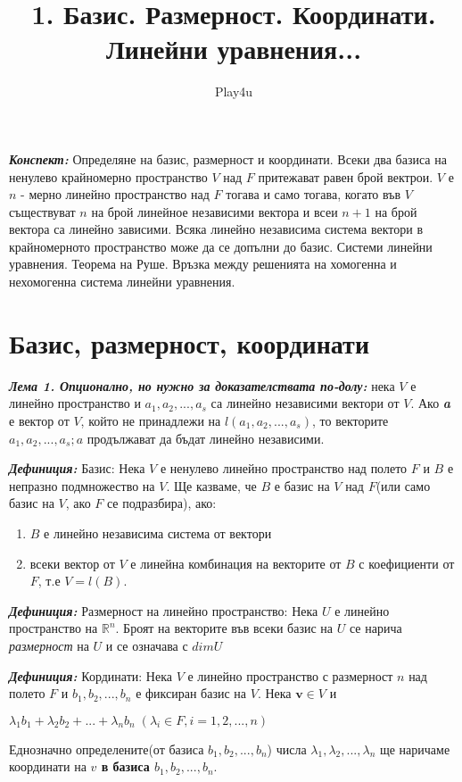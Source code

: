 \documentclass[11pt]{article} %
\title{1. Базис. Размерност. Координати. Линейни уравнения...}
\author{Play4u}
\newcommand{\italicBold}[1]{\textbf{\emph{#1}}}
\newcommand{\definition}{\italicBold{Дефиниция: }}
\newcommand{\enumNum}{\renewcommand{\theenumi}{\arabic{enumi}}}
\begin{document}
\maketitle

\italicBold{Конспект:} Определяне на базис, размерност и координати. Всеки два базиса на ненулево крайномерно пространство $V$ над $F$ притежават равен брой вектрои. $V$ е $n$ - мерно линейно пространство над $F$ тогава и само тогава, когато във $V$ съществуват $n$ на брой линейное независими вектора и всеи $n+1$ на брой вектора са линейно зависими. Всяка линейно независима система вектори в крайномерното пространство може да се допълни до базис. Системи линейни уравнения. Теорема на Руше. Връзка между решенията на хомогенна и нехомогенна система линейни уравнения.


\section{Базис, размерност, координати}

\italicBold{Лема 1. Опционално, но нужно за доказателствата по-долу: } нека $V$ е линейно пространство и $a_{1}, a_{2}, ..., a_{s}$ са линейно независими вектори от $V$. Ако \textbf{\textit{a}} е вектор от $V$, който не принадлежи на $l(a_{1}, a_{2}, ..., a_{s})$, то векторите $a_{1}, a_{2}, ..., a_{s}; a$ продължават да бъдат линейно независими.\\\par   

\definition Базис: Нека $V$ е ненулево линейно пространство над полето $F$ и $B$ е непразно подмножество на $V$. Ще казваме, че $B$ е базис на $V$ над $F$(или само базис на $V$, ако $F$ се подразбира), ако: \\

\enumNum
\begin{enumerate}
	\item $B$ е линейно независима система от вектори \\
	\item всеки вектор от $V$ е линейна комбинация на векторите от $B$ с коефициенти от $F$, т.е $V = l(B)$.
\end{enumerate}\par

\definition Размерност на линейно пространство: Нека $U$ е линейно пространство на $\mathbb{R}^{n}$. Броят на векторите във всеки базис на $U$ се нарича \textit{размерност} на $U$ и се означава с $dimU$

\definition Кординати: Нека $V$ е линейно пространство с размерност $n$ над полето $F$ и $b_{1}, b_{2}, ..., b_{n}$ е фиксиран базис на $V$. Нека $\textbf{v} \in V$ и \\
\centerline{$\lambda_{1}b_{1} + \lambda_{2}b_{2}+...+\lambda_{n}b_{n} \; (\lambda_{i} \in F, i = 1, 2,..., n)$}
Еднозначно определените(от базиса $b_{1}, b_{2}, ..., b_{n}$) числа $\lambda_{1}, \lambda_{2}, ..., \lambda_{n}$ ще наричаме координати на \textbf{ $v$ в базиса $b_{1}, b_{2}, ..., b_{n}$}. \\\par
\end{document}

